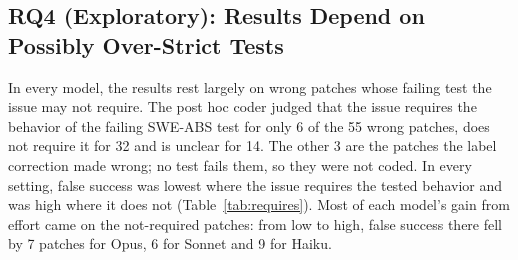 \documentclass[sigconf,nonacm]{acmart}
\begin{document}
\subsection{RQ4 (Exploratory): Results Depend on Possibly Over-Strict Tests}\label{sec:requires}

In every model, the results rest largely on wrong patches whose failing test the issue may not require. The post hoc coder judged that the issue requires the behavior of the failing SWE-ABS test for only 6 of the 55 wrong patches, does not require it for 32 and is unclear for 14. The other 3 are the patches the label correction made wrong; no test fails them, so they were not coded. In every setting, false success was lowest where the issue requires the tested behavior and was high where it does not (Table~\ref{tab:requires}). Most of each model's gain from effort came on the not-required patches: from low to high, false success there fell by 7 patches for Opus, 6 for Sonnet and 9 for Haiku.
\end{document}
